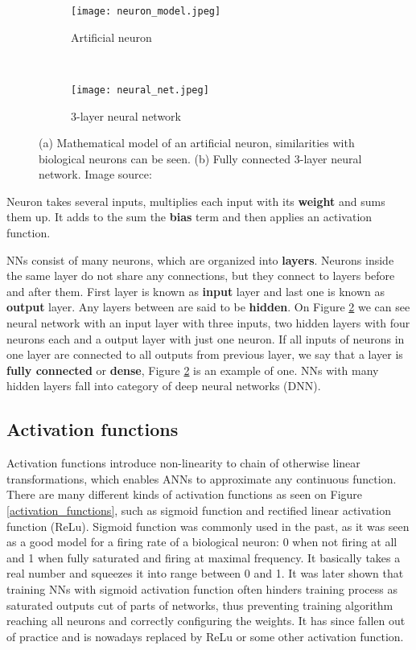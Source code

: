 \begin{figure}[ht] 
    \begin{subfigure}[b]{0.5\textwidth}
        \centering
        \texttt{[image: neuron\_model.jpeg]} 
        \caption{Artificial neuron}
        \label{neuron_model}
    \end{subfigure}
    \unskip\ \vrule\ 
    \begin{subfigure}[b]{0.5\textwidth}
        \centering
        \texttt{[image: neural\_net.jpeg]} 
        \caption{ 3-layer neural network}
        \label{neural_net}
    \end{subfigure}
    
    \caption{ (a) Mathematical model of an artificial neuron, similarities with biological neurons can be seen. (b) Fully connected 3-layer neural network. Image source: \cite{cs231n}}
    \label{neural}
\end{figure}

Neuron takes several inputs, multiplies each input with its \textbf{weight} and sums them up.
It adds to the sum the \textbf{bias} term and then applies an activation function.

NNs consist of many neurons, which are organized into \textbf{layers}.
Neurons inside the same layer do not share any connections, but they connect to layers before and after them.
First layer is known as \textbf{input} layer and last one is known as \textbf{output} layer. 
Any layers between are said to be \textbf{hidden}. 
On Figure \ref{neural_net} we can see neural network with an input layer with three inputs, two hidden layers with four neurons each and a output layer with just one neuron.
If all inputs of neurons in one layer are connected to all outputs from previous layer, we say that a layer is \textbf{fully connected} or \textbf{dense}, Figure \ref{neural_net} is an example of one.
NNs with many hidden layers fall into category of deep neural networks (DNN).


\subsection{ Activation functions}

Activation functions introduce non-linearity to chain of otherwise linear transformations, which enables ANNs to approximate any continuous function\cite{geron}.
There are many different kinds of activation functions as seen on Figure \ref{activation_functions}, such as sigmoid function and rectified linear activation function (ReLu).
Sigmoid function was commonly used in the past, as it was seen as a good model for a firing rate of a biological neuron: 0 when not firing at all and 1 when fully saturated and firing at maximal frequency\cite{cs231n}.
It basically takes a real number and squeezes it into range between 0 and 1.
It was later shown that training NNs with sigmoid activation function often hinders training process as saturated outputs cut of parts of networks, thus preventing training algorithm reaching all neurons and correctly configuring the weights\cite{cs231n}.
It has since fallen out of practice and is nowadays replaced by ReLu or some other activation function.

